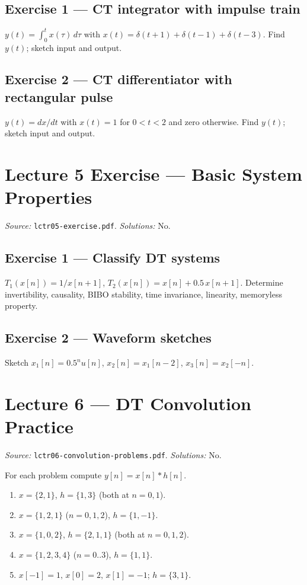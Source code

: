 \documentclass[11pt]{article}
\begin{document}
\subsection{Exercise 1 --- CT integrator with impulse train}
$y(t) = \int_0^t x(\tau)\,d\tau$ with $x(t) = \delta(t+1) + \delta(t-1) + \delta(t-3)$. Find $y(t)$; sketch input and output.

\subsection{Exercise 2 --- CT differentiator with rectangular pulse}
$y(t) = dx/dt$ with $x(t) = 1$ for $0<t<2$ and zero otherwise. Find $y(t)$; sketch input and output.

\section{Lecture 5 Exercise --- Basic System Properties}
\emph{Source:} \texttt{lctr05-exercise.pdf}. \emph{Solutions:} No.

\subsection{Exercise 1 --- Classify DT systems}
$T_1(x[n]) = 1/x[n+1]$, $T_2(x[n]) = x[n] + 0.5\,x[n+1]$. Determine invertibility, causality, BIBO stability, time invariance, linearity, memoryless property.

\subsection{Exercise 2 --- Waveform sketches}
Sketch $x_1[n] = 0.5^n u[n]$, $x_2[n] = x_1[n-2]$, $x_3[n] = x_2[-n]$.

\section{Lecture 6 --- DT Convolution Practice}
\emph{Source:} \texttt{lctr06-convolution-problems.pdf}. \emph{Solutions:} No.

For each problem compute $y[n] = x[n]*h[n]$.
\begin{enumerate}[leftmargin=*]
  \item $x=\{2,1\}$, $h=\{1,3\}$ (both at $n=0,1$).
  \item $x=\{1,2,1\}$ ($n=0,1,2$), $h=\{1,-1\}$.
  \item $x=\{1,0,2\}$, $h=\{2,1,1\}$ (both at $n=0,1,2$).
  \item $x=\{1,2,3,4\}$ ($n=0..3$), $h=\{1,1\}$.
  \item $x[-1]=1,\,x[0]=2,\,x[1]=-1$; $h=\{3,1\}$.
\end{enumerate}
\end{document}
